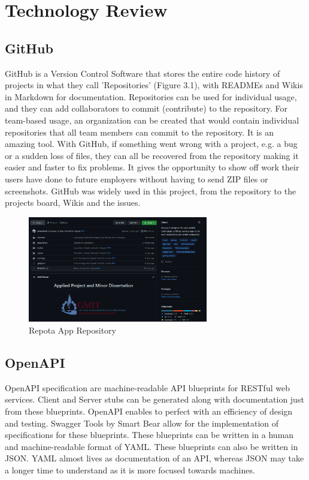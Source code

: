 \chapter{Technology Review}

\section{GitHub}
GitHub is a Version Control Software that stores the entire code history of projects in what they call 'Repositories' (Figure 3.1), with READMEs and Wikis in Markdown for documentation. Repositories can be used for individual usage, and they can add collaborators to commit (contribute) to the repository. For team-based usage, an organization can be created that would contain individual repositories that all team members can commit to the repository. It is an amazing tool. With GitHub, if something went wrong with a project, e.g. a bug or a sudden loss of files, they can all be recovered from the repository making it easier and faster to fix problems. It gives the opportunity to show off work their users have done to future employers without having to send ZIP files or screenshots. GitHub was widely used in this project, from the repository to the projects board, Wikis and the issues.

\begin{figure}[H]
    \caption{Repota App Repository}
    \label{image:gitRepo}
    \centering
    \includegraphics[width=0.7\textwidth]{images/misc/git-repo.png}
\end{figure}

\section{OpenAPI}
OpenAPI specification are machine-readable API blueprints for RESTful web services. Client and Server stubs can be generated along with documentation just from these blueprints. OpenAPI enables to perfect with an efficiency of design and testing. Swagger Tools by Smart Bear allow for the implementation of specifications for these blueprints. These blueprints can be written in a human and machine-readable format of YAML. These blueprints can also be written in JSON.  YAML almost lives as documentation of an API, whereas JSON may take a longer time to understand as it is more focused towards machines. \cite{ref6}

